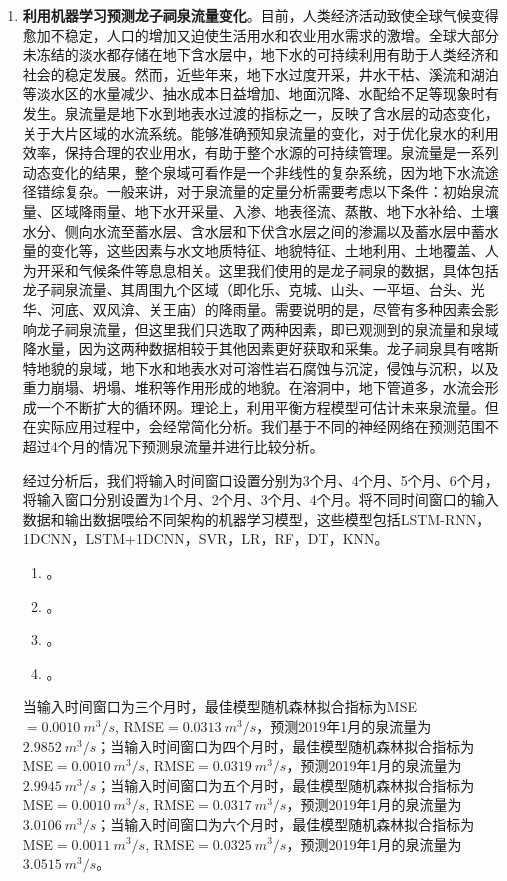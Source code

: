\begin{enumerate}
    \item \textbf{利用机器学习预测龙子祠泉流量变化}。目前，人类经济活动致使全球气候变得愈加不稳定，人口的增加又迫使生活用水和农业用水需求的激增。全球大部分未冻结的淡水都存储在地下含水层中，地下水的可持续利用有助于人类经济和社会的稳定发展。然而，近些年来，地下水过度开采，井水干枯、溪流和湖泊等淡水区的水量减少、抽水成本日益增加、地面沉降、水配给不足等现象时有发生。泉流量是地下水到地表水过渡的指标之一，反映了含水层的动态变化，关于大片区域的水流系统。能够准确预知泉流量的变化，对于优化泉水的利用效率，保持合理的农业用水，有助于整个水源的可持续管理。泉流量是一系列动态变化的结果，整个泉域可看作是一个非线性的复杂系统，因为地下水流途径错综复杂。一般来讲，对于泉流量的定量分析需要考虑以下条件：初始泉流量、区域降雨量、地下水开采量、入渗、地表径流、蒸散、地下水补给、土壤水分、侧向水流至蓄水层、含水层和下伏含水层之间的渗漏以及蓄水层中蓄水量的变化等，这些因素与水文地质特征、地貌特征、土地利用、土地覆盖、人为开采和气候条件等息息相关。这里我们使用的是龙子祠泉的数据，具体包括龙子祠泉流量、其周围九个区域（即化乐、克城、山头、一平垣、台头、光华、河底、双风渰、关王庙）的降雨量。需要说明的是，尽管有多种因素会影响龙子祠泉流量，但这里我们只选取了两种因素，即已观测到的泉流量和泉域降水量，因为这两种数据相较于其他因素更好获取和采集。龙子祠泉具有喀斯特地貌的泉域，地下水和地表水对可溶性岩石腐蚀与沉淀，侵蚀与沉积，以及重力崩塌、坍塌、堆积等作用形成的地貌。在溶洞中，地下管道多，水流会形成一个不断扩大的循环网。理论上，利用平衡方程模型可估计未来泉流量。但在实际应用过程中，会经常简化分析。我们基于不同的神经网络在预测范围不超过4个月的情况下预测泉流量并进行比较分析。
    
    经过分析后，我们将输入时间窗口设置分别为3个月、4个月、5个月、6个月，将输入窗口分别设置为1个月、2个月、3个月、4个月。将不同时间窗口的输入数据和输出数据喂给不同架构的机器学习模型，这些模型包括LSTM-RNN，1DCNN，LSTM+1DCNN，SVR，LR，RF，DT，KNN。

    \begin{enumerate}
      \item \textbf{}。
      \item \textbf{}。
      \item \textbf{}。
      \item \textbf{}。
    \end{enumerate}
    
    当输入时间窗口为三个月时，最佳模型随机森林拟合指标为MSE$=\SI{0.0010}{m^{3}/s}$, RMSE$=\SI{0.0313}{m^{3}/s}$，预测2019年1月的泉流量为$\SI{2.9852}{m^{3}/s}$；当输入时间窗口为四个月时，最佳模型随机森林拟合指标为MSE$=\SI{0.0010}{m^{3}/s}$, RMSE$=\SI{0.0319}{m^{3}/s}$，预测2019年1月的泉流量为$\SI{2.9945}{m^{3}/s}$；当输入时间窗口为五个月时，最佳模型随机森林拟合指标为MSE$=\SI{0.0010}{m^{3}/s}$, RMSE$=\SI{0.0317}{m^{3}/s}$，预测2019年1月的泉流量为$\SI{3.0106}{m^{3}/s}$；当输入时间窗口为六个月时，最佳模型随机森林拟合指标为MSE$=\SI{0.0011}{m^{3}/s}$, RMSE$=\SI{0.0325}{m^{3}/s}$，预测2019年1月的泉流量为$\SI{3.0515}{m^{3}/s}$。
    

\end{enumerate}
